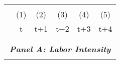 
    \begin{tabular}{lccccc} \hline
    \vspace{-2pt} & \vspace{-2pt} & \vspace{-2pt} & \vspace{-2pt} & \vspace{-2pt} \\
     & (1) & (2) & (3) & (4) & (5) \\
     & t & t+1 & t+2 & t+3 & t+4 \\ 
 
    \vspace{-2pt} & \vspace{-2pt} & \vspace{-2pt} & \vspace{-2pt} & \vspace{-2pt} \\
    \cmidrule{1-6}
    \vspace{-1.5pt} & \vspace{-1.5pt} & \vspace{-1.5pt} & \vspace{-1.5pt} & \vspace{-1.5pt} \\
    \multicolumn{6}{c}{\textit{\textbf{Panel A: Labor Intensity}}} \\ 
    \vspace{-1.5pt} & \vspace{-1.5pt} & \vspace{-1.5pt} & \vspace{-1.5pt} & \vspace{-1.5pt} \\


\end{tabular}
